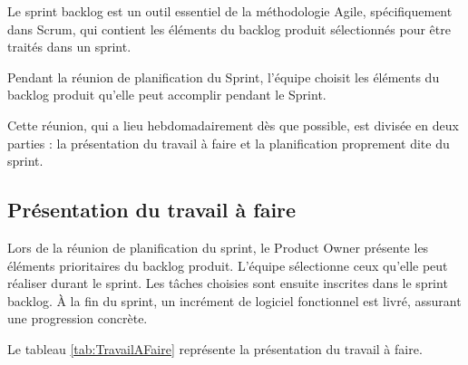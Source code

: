 \documentclass[12pt]{report}
\begin{document}
				\hspace{15pt} Le sprint backlog est un outil essentiel de la méthodologie Agile, spécifiquement dans Scrum, qui contient les éléments du backlog produit sélectionnés pour être traités dans un sprint.
	
				Pendant la réunion de planification du Sprint, l'équipe choisit les éléments du backlog produit qu'elle peut accomplir pendant le Sprint.

				Cette réunion, qui a lieu hebdomadairement dès que possible, est divisée en deux parties : la présentation du travail à faire et la planification proprement dite du sprint.

				\subsection{Présentation du travail à faire}

				\hspace{15pt} Lors de la réunion de planification du sprint, le Product Owner présente les éléments prioritaires du backlog produit. L'équipe sélectionne ceux qu'elle peut réaliser durant le sprint. Les tâches choisies sont ensuite inscrites dans le sprint backlog. À la fin du sprint, un incrément de logiciel fonctionnel est livré, assurant une progression concrète.

				Le tableau \ref{tab:TravailAFaire} représente la présentation du travail à faire.
\end{document}
